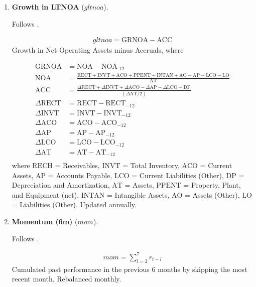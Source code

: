 \begin{enumerate}
	
	
	\item \textbf{Growth in LTNOA} ($gltnoa$). 
	
	Follows . 
	
	\begin{align*}
		gltnoa = \mathrm{GRNOA} - \mathrm{ACC}
	\end{align*}
	Growth in Net Operating Assets minus Accruals, where 
	
	\begin{align*}
		\mathrm{GRNOA} &= \mathrm{NOA} - \mathrm{NOA}_{\text{-12}} \\
		\mathrm{NOA} &= \frac{ \mathrm{RECT} + \mathrm{INVT} + \mathrm{ACO} + \mathrm{PPENT} + \mathrm{INTAN} + \mathrm{AO} - \mathrm{AP} - \mathrm{LCO} - \mathrm{LO} }{ \mathrm{AT} } \\
		\mathrm{ACC} &= \frac{ \Delta\mathrm{RECT} + \Delta\mathrm{INVT} + \Delta\mathrm{ACO} - \Delta\mathrm{AP} - \Delta\mathrm{LCO} - \mathrm{DP} }{ \left( \Delta\mathrm{AT} / 2 \right) } \\
		\Delta\mathrm{RECT} &= \mathrm{RECT} - \mathrm{RECT}_{-12} \\
		\Delta\mathrm{INVT} &= \mathrm{INVT} - \mathrm{INVT}_{-12} \\
		\Delta\mathrm{ACO} &= \mathrm{ACO} - \mathrm{ACO}_{-12} \\
		\Delta\mathrm{AP} &= \mathrm{AP} - \mathrm{AP}_{-12} \\
		\Delta\mathrm{LCO} &= \mathrm{LCO} - \mathrm{LCO}_{-12} \\
		\Delta\mathrm{AT} &= \mathrm{AT} - \mathrm{AT}_{-12} \\
	\end{align*}
	where $\mathrm{RECH}$ = Receivables, $\mathrm{INVT}$ = Total Inventory, $\mathrm{ACO}$ = Current Assets, $\mathrm{AP}$ = Accounts Payable, $\mathrm{LCO}$ =  Current Liabilities (Other), $\mathrm{DP}$ = Depreciation and Amortization, $\mathrm{AT}$ = Assets, $\mathrm{PPENT}$ = Property, Plant, and Equipment (net), $\mathrm{INTAN}$ = Intangible Assets, $\mathrm{AO}$ = Assets (Other), $\mathrm{LO}$ = Liabilities (Other). Updated annually.
	
	

	\item \textbf{Momentum (6m)} ($mom$). 
	
	Follows . 
	
	\begin{align*}
		mom = \sum_{l=2}^7 r_{t-l}
	\end{align*}
	Cumulated past performance in the previous 6 months by skipping the most recent month. Rebalanced monthly.
	

\end{enumerate}
